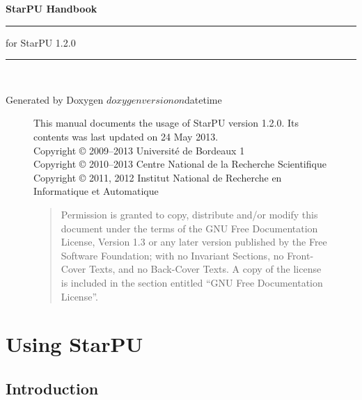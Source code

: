 \documentclass{book}
\begin{document}
\hypersetup{pageanchor=false,citecolor=blue}
\begin{titlepage}
\vspace*{4cm}
{\Huge \textbf{StarPU Handbook}}\\
\rule{\textwidth}{1.5mm}
\begin{flushright}
{\Large for StarPU 1.2.0}
\end{flushright}
\rule{\textwidth}{1mm}
~\\
\vspace*{15cm}
\begin{flushright}
Generated by Doxygen $doxygenversion on $datetime
\end{flushright}
\end{titlepage}

\begin{figure}[p]
This manual documents the usage of StarPU version 1.2.0. Its contents
was last updated on 24 May 2013.\\

Copyright © 2009–2013 Université de Bordeaux 1\\

Copyright © 2010–2013 Centre National de la Recherche Scientifique\\

Copyright © 2011, 2012 Institut National de Recherche en Informatique et Automatique\\

\medskip

\begin{quote}
Permission is granted to copy, distribute and/or modify this document
under the terms of the GNU Free Documentation License, Version 1.3 or
any later version published by the Free Software Foundation; with no
Invariant Sections, no Front-Cover Texts, and no Back-Cover Texts. A
copy of the license is included in the section entitled “GNU Free
Documentation License”.
\end{quote}
\end{figure}

\clearemptydoublepage
{}
\tableofcontents
\clearemptydoublepage
{}
\hypersetup{pageanchor=true,citecolor=blue}

\part{Using StarPU}

\chapter{Introduction}
\label{index}
\hypertarget{index}{}

\end{document}
